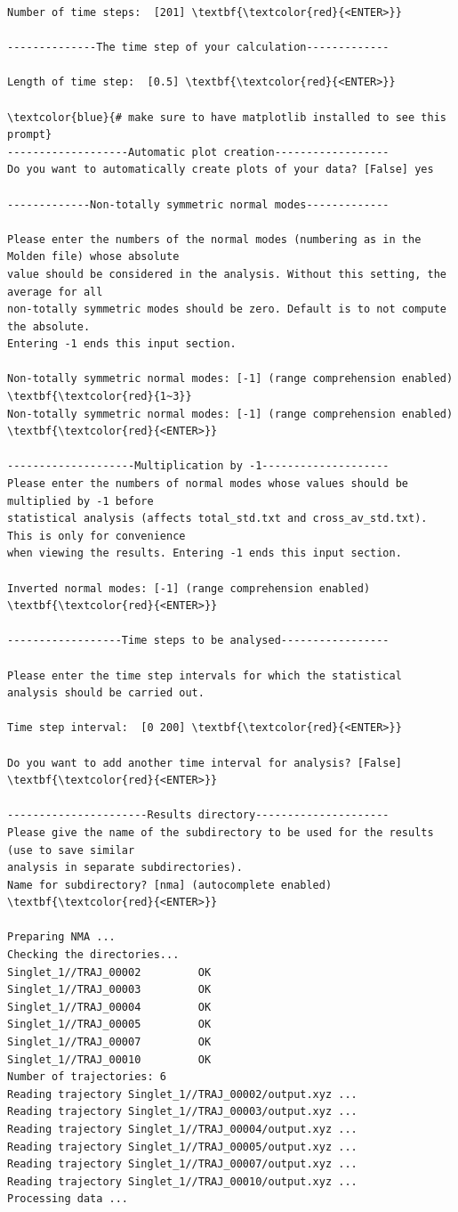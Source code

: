 \documentclass[a4paper,11pt,DIV=15,openany]{scrbook}
\begin{document}
\begin{oframed}
\begin{Verbatim}[commandchars=\\\{\}]
Number of time steps:  [201] \textbf{\textcolor{red}{<ENTER>}}

--------------The time step of your calculation-------------

Length of time step:  [0.5] \textbf{\textcolor{red}{<ENTER>}}

\textcolor{blue}{# make sure to have matplotlib installed to see this prompt}
-------------------Automatic plot creation------------------
Do you want to automatically create plots of your data? [False] yes 

-------------Non-totally symmetric normal modes-------------

Please enter the numbers of the normal modes (numbering as in the Molden file) whose absolute 
value should be considered in the analysis. Without this setting, the average for all 
non-totally symmetric modes should be zero. Default is to not compute the absolute. 
Entering -1 ends this input section.

Non-totally symmetric normal modes: [-1] (range comprehension enabled) \textbf{\textcolor{red}{1~3}}
Non-totally symmetric normal modes: [-1] (range comprehension enabled) \textbf{\textcolor{red}{<ENTER>}}

--------------------Multiplication by -1--------------------
Please enter the numbers of normal modes whose values should be multiplied by -1 before 
statistical analysis (affects total_std.txt and cross_av_std.txt). This is only for convenience
when viewing the results. Entering -1 ends this input section.

Inverted normal modes: [-1] (range comprehension enabled) \textbf{\textcolor{red}{<ENTER>}}

------------------Time steps to be analysed-----------------

Please enter the time step intervals for which the statistical analysis should be carried out. 

Time step interval:  [0 200] \textbf{\textcolor{red}{<ENTER>}}

Do you want to add another time interval for analysis? [False] \textbf{\textcolor{red}{<ENTER>}}

----------------------Results directory---------------------
Please give the name of the subdirectory to be used for the results (use to save similar 
analysis in separate subdirectories).
Name for subdirectory? [nma] (autocomplete enabled) \textbf{\textcolor{red}{<ENTER>}}

Preparing NMA ...
Checking the directories...
Singlet_1//TRAJ_00002         OK
Singlet_1//TRAJ_00003         OK
Singlet_1//TRAJ_00004         OK
Singlet_1//TRAJ_00005         OK
Singlet_1//TRAJ_00007         OK
Singlet_1//TRAJ_00010         OK
Number of trajectories: 6
Reading trajectory Singlet_1//TRAJ_00002/output.xyz ...
Reading trajectory Singlet_1//TRAJ_00003/output.xyz ...
Reading trajectory Singlet_1//TRAJ_00004/output.xyz ...
Reading trajectory Singlet_1//TRAJ_00005/output.xyz ...
Reading trajectory Singlet_1//TRAJ_00007/output.xyz ...
Reading trajectory Singlet_1//TRAJ_00010/output.xyz ...
Processing data ...
\end{Verbatim}
\end{oframed}
\end{document}
